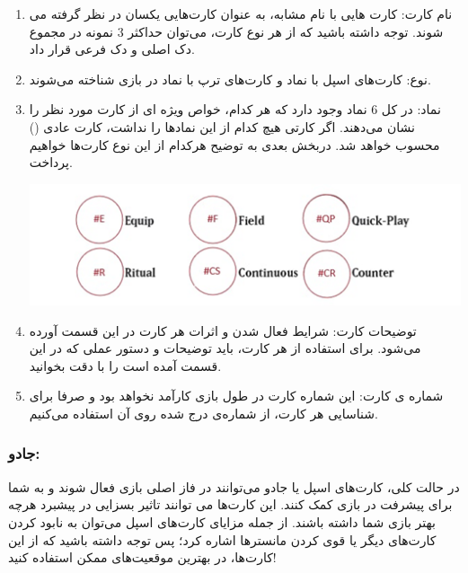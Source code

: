 \documentclass[]{article}
\begin{document}
\begin{enumerate}
	
	\item
	نام کارت: کارت هایی با نام مشابه، به عنوان کارت‌هایی یکسان  در نظر گرفته می شوند. توجه داشته باشید که از هر نوع کارت، می‌توان حداکثر 3 نمونه در مجموع دک اصلی و دک فرعی قرار داد.
	
	\item
	نوع: کارت‌های اسپل با نماد    و کارت‌های ترپ با نماد   در بازی شناخته می‌شوند.
	
	
	\item
	نماد: در کل 6 نماد وجود دارد که هر کدام، خواص ویژه ای از کارت مورد نظر را نشان می‌دهند. اگر کارتی هیچ کدام از این نمادها را نداشت، کارت عادی () محسوب خواهد شد. دربخش بعدی به توضیح هرکدام از این نوع کارت‌ها خواهیم پرداخت.
	
	\begin{center}
		\includegraphics[width =1.0 \textwidth]{Resources/spelltrap.png}
		
	\end{center}
	
	
	
	\item
	 توضیحات کارت: شرایط فعال شدن و اثرات هر کارت در این قسمت آورده می‌شود. برای استفاده از هر کارت، باید توضیحات و دستور عملی که در این قسمت آمده است را با دقت بخوانید.
	
	\item
شماره ی کارت: این شماره کارت در طول بازی کارآمد نخواهد بود  و صرفا برای شناسایی هر کارت، از شماره‌ی درج شده روی آن استفاده می‌کنیم.
	
	
	
\end{enumerate}


\subsubsection*{{\titr جادو:}}

در حالت کلی، کارت‌های اسپل یا جادو می‌توانند در فاز اصلی بازی فعال شوند و به شما برای پیشرفت در بازی کمک کنند. این کارت‌ها می توانند تاثیر بسزایی در پیشبرد هرچه بهتر بازی شما داشته باشند. از جمله مزایای کارت‌های اسپل می‌توان به نابود کردن کارت‌های دیگر یا قوی کردن مانستر‌ها اشاره کرد؛ پس توجه داشته باشید که از این کارت‌ها، در بهترین موقعیت‌های ممکن استفاده کنید!
\end{document}
